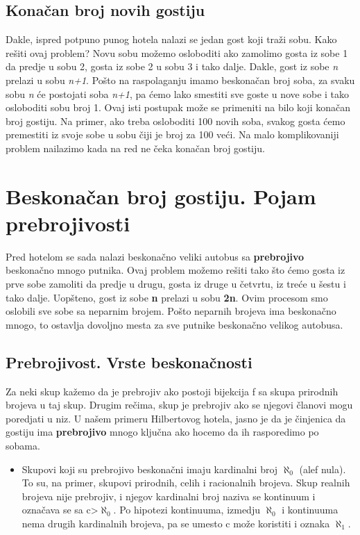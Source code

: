 \documentclass[a4paper]{article}
\begin{document}
\subsection{Konačan broj novih gostiju}
Dakle, ispred potpuno punog hotela nalazi se jedan gost koji traži sobu. Kako rešiti ovaj problem?
Novu sobu možemo osloboditi ako zamolimo gosta iz sobe 1 da predje u sobu 2, gosta iz sobe 2 u sobu 3 i tako dalje. Dakle, gost iz sobe \textit{n} prelazi u sobu \textit{n+1}.
Pošto na raspolaganju imamo beskonačan broj soba, za svaku sobu \textit{n} će postojati soba \textit{n+1}, pa ćemo lako smestiti sve goste u nove sobe i tako osloboditi sobu broj 1.
Ovaj isti postupak može se primeniti na bilo koji konačan broj gostiju. Na primer, ako treba osloboditi 100 novih soba, svakog gosta ćemo premestiti iz svoje sobe u sobu čiji je broj za 100 veći.
Na malo komplikovaniji problem nailazimo kada na red ne čeka konačan broj gostiju.

\newpage
\section{Beskonačan broj gostiju. Pojam prebrojivosti}
\label{sec:beskonačan broj gostiju}
Pred hotelom se sada nalazi beskonačno veliki autobus sa \textbf {prebrojivo} beskonačno mnogo putnika.
Ovaj problem možemo rešiti tako što ćemo gosta iz prve sobe zamoliti da predje u drugu, gosta iz druge u četvrtu, iz treće u šestu i tako dalje.
Uopšteno, gost iz sobe \textbf {n} prelazi u sobu \textbf {2n}. Ovim procesom smo oslobili sve sobe sa neparnim brojem.
Pošto neparnih brojeva ima beskonačno mnogo, to ostavlja dovoljno mesta za sve putnike beskonačno velikog autobusa.
\subsection {Prebrojivost. Vrste beskonačnosti}
Za neki skup kažemo da je prebrojiv ako postoji bijekcija f sa skupa prirodnih brojeva u taj skup.
Drugim rečima, skup je prebrojiv ako se njegovi članovi mogu poredjati u niz.
U našem primeru Hilbertovog hotela, jasno je da je činjenica da gostiju ima \textbf {prebrojivo} mnogo ključna ako hocemo da ih rasporedimo po sobama.
\begin {itemize}
\item Skupovi koji su prebrojivo beskonačni imaju kardinalni broj $\aleph_{0}$ (alef nula).
To su, na primer, skupovi prirodnih, celih i racionalnih brojeva.
Skup realnih brojeva nije prebrojiv, i njegov kardinalni broj naziva se kontinuum i označava se sa c>$\aleph_{0}$.
Po hipotezi kontinuuma, izmedju $\aleph_{0}$ i kontinuuma nema drugih kardinalnih brojeva, pa se umesto c može koristiti i oznaka $\aleph_{1}$.
\end {itemize}
\end{document}
